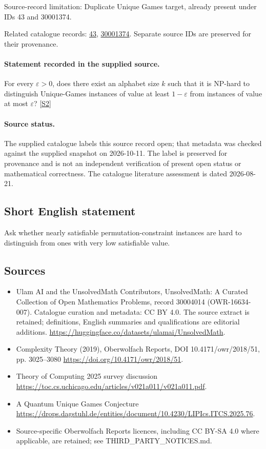 \documentclass[11pt]{article}
\begin{document}
Source-record limitation: Duplicate Unique Games target, already present under IDs 43 and 30001374.

Related catalogue records: \href{https://mehmetmars7.github.io/Erdosproblems-llm-hunter/problem.html?type=open_problems&id=43}{43}, \href{https://mehmetmars7.github.io/Erdosproblems-llm-hunter/problem.html?type=open_problems&id=30001374}{30001374}. Separate source IDs are preserved for their provenance.
\paragraph{Statement recorded in the supplied source.}
For every $\varepsilon>0$, does there exist an alphabet size $k$ such that it is NP-hard to distinguish Unique-Games instances of value at least $1-\varepsilon$ from instances of value at most $\varepsilon$? \href{https://doi.org/10.4171/owr/2018/51}{[S2]}
\paragraph{Source status.}
The supplied catalogue labels this source record open; that metadata was checked against the supplied snapshot on 2026-10-11. The label is preserved for provenance and is not an independent verification of present open status or mathematical correctness. The catalogue literature assessment is dated 2026-08-21.
\subsection{Short English statement}
Ask whether nearly satisfiable permutation-constraint instances are hard to distinguish from ones with very low satisfiable value.
\subsection{Sources}
\begin{itemize}
\item[S1] Ulam AI and the UnsolvedMath Contributors, UnsolvedMath: A Curated Collection of Open Mathematics Problems, record 30004014 (OWR-16634-007). Catalogue curation and metadata: CC BY 4.0. The source extract is retained; definitions, English summaries and qualifications are editorial additions.
\url{https://huggingface.co/datasets/ulamai/UnsolvedMath}.
\item[S2] Complexity Theory (2019), Oberwolfach Reports, DOI 10.4171/owr/2018/51, pp. 3025--3080
\url{https://doi.org/10.4171/owr/2018/51}.
\item[S3] Theory of Computing 2025 survey discussion
\url{https://toc.cs.uchicago.edu/articles/v021a011/v021a011.pdf}.
\item[S4] A Quantum Unique Games Conjecture
\url{https://drops.dagstuhl.de/entities/document/10.4230/LIPIcs.ITCS.2025.76}.
\item Source-specific Oberwolfach Reports licences, including CC BY-SA 4.0 where applicable, are retained; see THIRD\_PARTY\_NOTICES.md.
\end{itemize}
\end{document}
